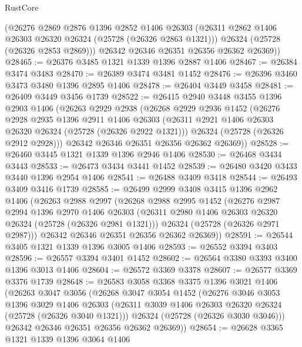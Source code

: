 \begin{lexlean}{RustCore}
\begin{coremodule}
        (@26276
          @2869
          @2876
          @1396
          @2852
          @1406
          @26303
          (@26311 @2862 @1406 @26303 @26320 @26324 (@25728 (@26326 @2863 @1321)))
          @26324
          (@25728 (@26326 @2853 @2869)))
        @26342
        @26346
        @26351
        @26356
        @26362
        @26369))
@28465 := @26376 @3485 @1321 @1339 @1396 @2887 @1406
@28467 := @26384 @3474 @3483
@28470 := @26389 @3474 @3481 @1452
@28476 := @26396 @3460 @3473 @3480 @1396 @2895 @1406
@28478 := @26404 @3449 @3458
@28481 := @26409 @3449 @3456 @1739
@28522 := @26415
    @2940
    @3448
    @3455
    @1396
    @2903
    @1406
    (@26263
      @2929
      @2938
      (@26268
        @2929
        @2936
        @1452
        (@26276
          @2928
          @2935
          @1396
          @2911
          @1406
          @26303
          (@26311 @2921 @1406 @26303 @26320 @26324 (@25728 (@26326 @2922 @1321)))
          @26324
          (@25728 (@26326 @2912 @2928)))
        @26342
        @26346
        @26351
        @26356
        @26362
        @26369))
@28528 := @26460 @3445 @1321 @1339 @1396 @2946 @1406
@28530 := @26468 @3434 @3443
@28533 := @26473 @3434 @3441 @1452
@28539 := @26480 @3420 @3433 @3440 @1396 @2954 @1406
@28541 := @26488 @3409 @3418
@28544 := @26493 @3409 @3416 @1739
@28585 := @26499
    @2999
    @3408
    @3415
    @1396
    @2962
    @1406
    (@26263
      @2988
      @2997
      (@26268
        @2988
        @2995
        @1452
        (@26276
          @2987
          @2994
          @1396
          @2970
          @1406
          @26303
          (@26311 @2980 @1406 @26303 @26320 @26324 (@25728 (@26326 @2981 @1321)))
          @26324
          (@25728 (@26326 @2971 @2987)))
        @26342
        @26346
        @26351
        @26356
        @26362
        @26369))
@28591 := @26544 @3405 @1321 @1339 @1396 @3005 @1406
@28593 := @26552 @3394 @3403
@28596 := @26557 @3394 @3401 @1452
@28602 := @26564 @3380 @3393 @3400 @1396 @3013 @1406
@28604 := @26572 @3369 @3378
@28607 := @26577 @3369 @3376 @1739
@28648 := @26583
    @3058
    @3368
    @3375
    @1396
    @3021
    @1406
    (@26263
      @3047
      @3056
      (@26268
        @3047
        @3054
        @1452
        (@26276
          @3046
          @3053
          @1396
          @3029
          @1406
          @26303
          (@26311 @3039 @1406 @26303 @26320 @26324 (@25728 (@26326 @3040 @1321)))
          @26324
          (@25728 (@26326 @3030 @3046)))
        @26342
        @26346
        @26351
        @26356
        @26362
        @26369))
@28654 := @26628 @3365 @1321 @1339 @1396 @3064 @1406

\end{coremodule}
\end{lexlean}
